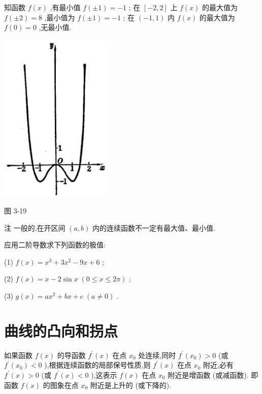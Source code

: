 \documentclass[lang=cn,newtx,12pt,scheme=chinese]{elegantbook}
\begin{document}
知函数 \(f\left( x\right)\) ,有最小值 \(f\left( {\pm 1}\right) = - 1\) ; 在 \(\left\lbrack {-2,2}\right\rbrack\) 上 \(f\left( x\right)\) 的最大值为 \(f\left( {\pm 2}\right) = 8\) ,最小值为 \(f\left( {\pm 1}\right) = - 1\) ; 在 \(\left( {-1,1}\right)\) 内 \(f\left( x\right)\) 的最大值为 \(f\left( 0\right) = 0\) ,无最小值.

\begin{center}
\includegraphics[max width=0.4\textwidth]{images/01912c18-5c3f-733d-b775-749ba9897a9d_164_907490.jpg}
\end{center}

图 3-19

注 一般的,在开区间 \(\left( {a,b}\right)\) 内的连续函数不一定有最大值、最小值.

\begin{problemset}[练习]

\item 应用二阶导数求下列函数的极值:

(1) \(f\left( x\right) = {x}^{3} + 3{x}^{2} - {9x} + 6\) ;

(2) \(f\left( x\right) = x - 2\sin x\;\left( {0 \leq x \leq {2\pi }}\right)\) ;

(3) \(g\left( x\right) = a{x}^{2} + {bx} + c\;\left( {a \neq 0}\right)\) .

\end{problemset}

\section{曲线的凸向和拐点}

如果函数 \(f\left( x\right)\) 的导函数 \({f}^{\prime }\left( x\right)\) 在点 \({x}_{0}\) 处连续,同时 \({f}^{\prime }\left( {x}_{0}\right) > 0\) (或 \({f}^{\prime }\left( {x}_{0}\right) < 0\) ),根据连续函数的局部保号性质,则 \({f}^{\prime }\left( x\right)\) 在点 \({x}_{0}\) 附近,必有 \({f}^{\prime }\left( x\right) > 0\) (或 \({f}^{\prime }\left( x\right) < 0\) ),这表示 \(f\left( x\right)\) 在点 \({x}_{0}\) 附近是增函数 (或减函数). 即函数 \(f\left( x\right)\) 的图象在点 \({x}_{0}\) 附近是上升的 (或下降的).
\end{document}

